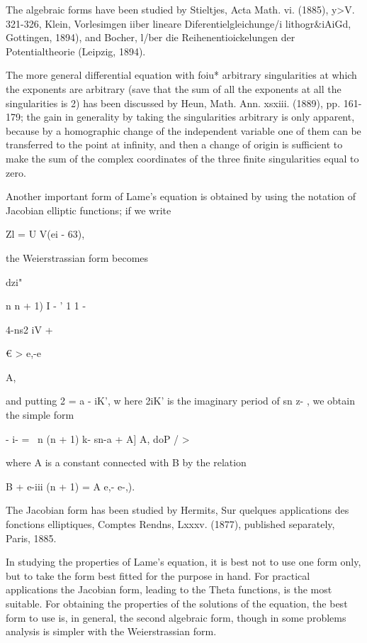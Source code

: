 {{{{The algebraic forms have been studied by Stieltjes, Acta Math. vi.
(1885), y>V. 321-326, Klein, Vorlesimgen iiber lineare
Diferentielgleichunge/i lithogr\&iAiGd, Gottingen, 1894), and Bocher,
l/ber die Reihenentioickelungen der Potentialtheorie (Leipzig, 1894).

The more general differential equation with foiu* arbitrary
singularities at which the exponents are arbitrary (save that the sum
of all the exponents at all the singularities is 2) has been discussed
by Heun, Math. Ann. xsxiii. (1889), pp. 161-179; the gain in
generality by taking the singularities arbitrary is only apparent,
because by a homographic change of the independent variable one of
them can be transferred to the point at infinity, and then a change of
origin is sufficient to make the sum of the complex coordinates of the
three finite singularities equal to zero.

Another important form of Lame's equation is obtained by using the
notation of Jacobian elliptic functions; if we write

Zl = U V(ei - 63),

the Weierstrassian form becomes

dzi"

n n + 1) I - ' 1 1 -

4-ns2 iV +

€ > e,-e

A,

and putting 2 = a - iK', w here 2iK' is the imaginary period of sn z-
, we obtain the simple form

- i- = \ n (n + 1) k- sn-a + A] A, doP / >

where A is a constant connected with B by the relation

B + e-iii (n + 1) = A e,- e-,).

The Jacobian form has been studied by Hermits, Sur quelques
applications des fonctions elliptiques, Comptes Rendns, Lxxxv. (1877),
published separately, Paris, 1885.

In studying the properties of Lame's equation, it is best not to use
one form only, but to take the form best fitted for the purpose in
hand. For practical applications the Jacobian form, leading to the
Theta functions, is the most suitable. For obtaining the properties of
the solutions of the equation, the best form to use is, in general,
the second algebraic form, though in some problems analysis is simpler
with the Weierstrassian form.

%
%

}}}}
